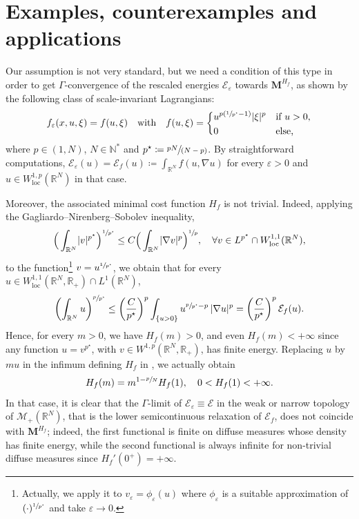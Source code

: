 \documentclass[10pt]{amsart}
\newcommand{\spfrac}[2]{{\sfrac{#1}{(#2)}}}
\theoremstyle{plain}
\theoremstyle{definition}
\newcommand{\N}{\mathbb{N}}
\newcommand{\R}{\mathbb{R}}
\newcommand{\Mspace}{\mathscr{M}}
\newcommand{\ener}{\mathcal{E}}
\newcommand{\mass}{\boldsymbol{M}}
\newcommand{\loc}{\mathrm{loc}}
\newcommand{\eps}{\varepsilon}
\DeclarePairedDelimiter{\abs}{\lvert}{\rvert}
\begin{document}
\section{Examples, counterexamples and applications}\label{sectionExamples}

\label{sectionCounterExamples}

Our assumption  is not very standard, but we need a condition of this type in order to get \(\Gamma\)-convergence of the rescaled energies \(\ener_\eps\) towards \(\mass^{H_f}\), as shown by the following class of scale-invariant Lagrangians:
\begin{equation}
\label{gagliardoExample}
f_\eps(x,u,\xi)= f(u,\xi)
\quad \text{with}\quad
f(u,\xi)= \begin{dcases*}
u^{p(\sfrac{1}{p^\star}-1)}\abs{\xi}^p& if $u> 0$,\\
0& else, \end{dcases*}
\end{equation}
where \(p\in (1,N)\), \(N\in\N^\ast\) and $p^\star\coloneqq\spfrac{pN}{N-p}$. By straightforward computations, \(\ener_\eps(u)= \ener_f(u)\coloneqq \int_{\R^N}f(u,\nabla u)\) for every \(\eps>0\) and \(u\in W^{1,p}_\loc(\R^N)\) in that case.

Moreover, the associated minimal cost function \(H_f\) is not trivial. Indeed, applying the Gagliardo--Nirenberg--Sobolev inequality,
\[
\Big(\int_{\R^N}\abs{v}^{p^\star}\Big)^{\sfrac{1}{p^\star}}\leq
C\Big(\int_{\R^N}\abs{\nabla v}^p\Big)^{\sfrac{1}{p}},\quad\forall v\in L^{p^\star} \cap W^{1,1}_\loc(\R^N),
\]
to the function\footnote{Actually, we apply it to $v_\eps = \phi_\eps(u)$ where $\phi_\eps$ is a suitable approximation of $(\cdot)^{\sfrac 1{p^\star}}$ and take $\eps\to 0$.} \(v=u^{\sfrac{1}{p^\star}}\), we obtain that for every \(u\in W^{1,1}_\loc(\R^N,\R_+)\cap L^1(\R^N)\),
\[
\left(\int_{\R^N}u\right)^{\sfrac{p}{p^\star}}\leq \left(\frac{C}{p^\star}\right)^p \int_{\{u>0\}}u^{\sfrac{p}{p^\star}-p}\,\abs{\nabla u}^p=\left(\frac{C}{p^\star}\right)^p\ener_f(u).
\]
Hence, for every \(m>0\), we have \(H_f(m)>0\), and even \(H_f(m)<+\infty\) since any function \(u=v^{p^\star}\), with \(v\in W^{1,p}(\R^N,\R_+)\), has finite energy. Replacing \(u\) by \(mu\) in the infimum defining \(H_f\) in , we actually obtain
\begin{equation}
\label{gagliardoHmass}
H_f(m)=m^{1-\sfrac{p}{N}}H_f(1),\quad 0<H_f(1)<+\infty.
\end{equation}
In that case, it is clear that the \(\Gamma\)-limit of \(\ener_\eps\equiv\ener\) in the weak or narrow topology of \(\Mspace_+(\R^N)\), that is the lower semicontinuous relaxation of \(\ener_f\), does not coincide with \(\mass^{H_f}\); indeed, the first functional is finite on diffuse measures whose density has finite energy, while the second functional is always infinite for non-trivial diffuse measures since \(H_f'(0^+)=+\infty\).
\end{document}
